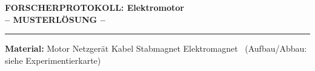 \documentclass[10pt, a4paper]{article}
\begin{document}

\begin{center}
    {\large\bfseries\textcolor{fachfarbe}{FORSCHERPROTOKOLL: Elektromotor}}\\[0.2em]
    {\normalsize\textcolor{loesung}{\textbf{-- MUSTERLÖSUNG --}}}
\end{center}
\vspace{-0.4em}
\hrule
\vspace{0.3em}


\begin{materialbox}
\small\textbf{Material:} Motor \textbullet{} Netzgerät \textbullet{} Kabel \textbullet{} Stabmagnet \textbullet{} Elektromagnet ~{\footnotesize(Aufbau/Abbau: siehe Experimentierkarte)}
\end{materialbox}

\end{document}
